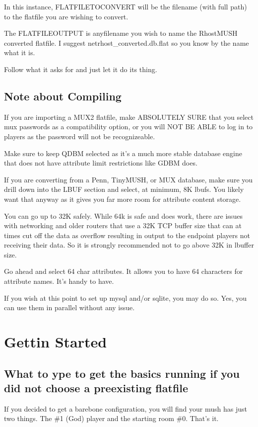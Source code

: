 \documentclass[letterpaper,10pt,english]{sphinxmanual}
\begin{document}
\sphinxAtStartPar
In this instance, FLATFILETOCONVERT will be the filename (with full path) to
the flatfile you are wishing to convert.

\sphinxAtStartPar
The FLATFILEOUTPUT is anyfilename you wish to name the RhostMUSH converted
flatfile.  I suggest netrhost\_converted.db.flat so you know by the name
what it is.

\sphinxAtStartPar
Follow what it asks for and just let it do its thing.


\section{Note about Compiling}
\label{\detokenize{database:note-about-compiling}}
\sphinxAtStartPar
If you are importing a MUX2 flatfile, make ABSOLUTELY SURE that you select
mux passwords as a compatibility option, or you will NOT BE ABLE to log in
to players as the password will not be recognizeable.

\sphinxAtStartPar
Make sure to keep QDBM selected as it’s a much more stable database engine
that does not have attribute limit restrictions like GDBM does.

\sphinxAtStartPar
If you are converting from a Penn, TinyMUSH, or MUX database, make sure you
drill down into the LBUF section and select, at minimum, 8K lbufs.  You likely
want that anyway as it gives you far more room for attribute content storage.

\sphinxAtStartPar
You can go up to 32K safely.  While 64k is safe and does work, there are issues
with networking and older routers that use a 32K TCP buffer size that can
at times cut off the data as overflow resulting in output to the end\sphinxhyphen{}point
players not receiving their data.  So it is strongly recommended not to go
above 32K in lbuffer size.

\sphinxAtStartPar
Go ahead and select 64 char attributes.  It allows you to have 64 characters
for attribute names.  It’s handy to have.

\sphinxAtStartPar
If you wish at this point to set up mysql and/or sqlite, you  may do so.
Yes, you can use them in parallel without any issue.


\chapter{Gettin Started}
\label{\detokenize{gettingstarted:gettin-started}}\label{\detokenize{gettingstarted::doc}}

\section{What to ype to get the basics running if you did not choose a pre\sphinxhyphen{}existing flatfile}
\label{\detokenize{gettingstarted:what-to-ype-to-get-the-basics-running-if-you-did-not-choose-a-pre-existing-flatfile}}
\sphinxAtStartPar
If you decided to get a bare\sphinxhyphen{}bone configuration, you will find your mush has just two things.  The \#1 (God) player and the starting room \#0.  That’s it.
\end{document}
